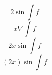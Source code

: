 \documentclass{article}
\begin{document}
\[ 2\sin\int f \]
\[ x\nabla\int f \]
\[ 2x\sin\int f \]
\[ (2x)\sin\int f \]
\end{document}
